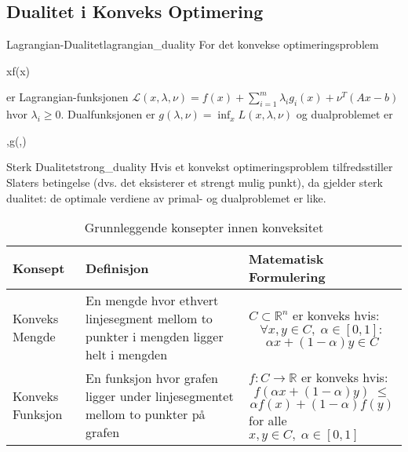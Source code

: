 \subsection{Dualitet i Konveks Optimering}
\begin{definition}{Lagrangian-Dualitet}{lagrangian_duality}
	For det konvekse optimeringsproblem
	\begin{mini}
		{x}{f(x)}{}{}
	\end{mini}
	er Lagrangian-funksjonen \( \mathcal{L}(x,\lambda,\nu) = f(x) + \sum_{i=1}^m \lambda_i g_i(x) + \nu^T(Ax-b) \) hvor \( \lambda_i \geq 0 \).
	Dualfunksjonen er \( g(\lambda,\nu) = \inf_x L(x,\lambda,\nu) \) og dualproblemet er
	\begin{maxi}
		{\lambda,\nu}{g(\lambda,\nu)}{}{}
	\end{maxi}
\end{definition}

\begin{theorem}{Sterk Dualitet}{strong_duality}
	Hvis et konvekst optimeringsproblem tilfredsstiller Slaters betingelse (dvs. det eksisterer et strengt mulig punkt), da gjelder sterk dualitet: de optimale verdiene av primal- og dualproblemet er like.
\end{theorem}

\begin{table}[H]
	\centering
	\begin{tabular}{|p{3cm}|p{5cm}|p{6cm}|}
		\hline
		\rowcolor{blue!25}
		\textbf{Konsept} & \textbf{Definisjon}                                                                   & \textbf{Matematisk Formulering} \\
		\hline
		Konveks Mengde   & En mengde hvor ethvert linjesegment mellom to punkter i mengden ligger helt i mengden &
		\(C\subset \mathbb{R}^n\) er konveks hvis:
		\[\forall x,y\in C,\;\alpha\in [0,1]:\]
		\[\alpha x + (1-\alpha) y\in C\]                                                                                                           \\
		\hline
		\rowcolor{blue!5}
		Konveks Funksjon & En funksjon hvor grafen ligger under linjesegmentet mellom to punkter på grafen       &
		\(f: C \to \mathbb{R}\) er konveks hvis:
		\[f(\alpha x + (1-\alpha) y)\;\le\]\[\alpha f(x) + (1-\alpha) f(y)\]
		for alle \(x,y\in C,\;\alpha\in [0,1]\)                                                                                                    \\
		\hline
	\end{tabular}
	\caption{Grunnleggende konsepter innen konveksitet}
	\label{tab:basic_concepts}
\end{table}

